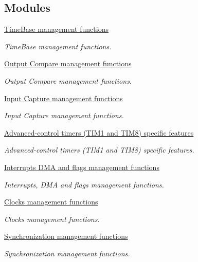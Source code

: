 \subsection*{Modules}
\begin{DoxyCompactItemize}
\item 
\hyperlink{group___t_i_m___group1}{Time\+Base management functions}
\begin{DoxyCompactList}\small\item\em Time\+Base management functions. \end{DoxyCompactList}\item 
\hyperlink{group___t_i_m___group2}{Output Compare management functions}
\begin{DoxyCompactList}\small\item\em Output Compare management functions. \end{DoxyCompactList}\item 
\hyperlink{group___t_i_m___group3}{Input Capture management functions}
\begin{DoxyCompactList}\small\item\em Input Capture management functions. \end{DoxyCompactList}\item 
\hyperlink{group___t_i_m___group4}{Advanced-\/control timers (\+T\+I\+M1 and T\+I\+M8) specific features}
\begin{DoxyCompactList}\small\item\em Advanced-\/control timers (T\+I\+M1 and T\+I\+M8) specific features. \end{DoxyCompactList}\item 
\hyperlink{group___t_i_m___group5}{Interrupts D\+M\+A and flags management functions}
\begin{DoxyCompactList}\small\item\em Interrupts, D\+MA and flags management functions. \end{DoxyCompactList}\item 
\hyperlink{group___t_i_m___group6}{Clocks management functions}
\begin{DoxyCompactList}\small\item\em Clocks management functions. \end{DoxyCompactList}\item 
\hyperlink{group___t_i_m___group7}{Synchronization management functions}
\begin{DoxyCompactList}\small\item\em Synchronization management functions. \end{DoxyCompactList}\item 

\end{DoxyCompactItemize}
